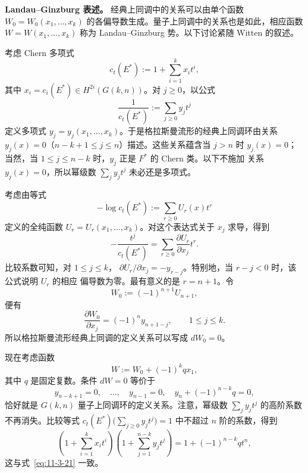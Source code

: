 \medskip
\noindent\textbf{Landau--Ginzburg 表述。}
经典上同调中的关系可以由单个函数
$W_0=W_0(x_1,\ldots,x_k)$ 的各偏导数生成。量子上同调中的关系也是如此，相应函数
$W=W(x_1,\ldots,x_k)$ 称为 Landau--Ginzburg 势。以下讨论紧随 Witten
 的叙述。

考虑 Chern 多项式
\[
  c_t(E^*):=1+\sum_{i=1}^kx_it^i,
\]
其中 $x_i=c_i(E^*)\in H^{2i}(G(k,n))$。对 $j\geq0$，以公式
\[
  \frac1{c_t(E^*)}:=\sum_{j\geq0}y_jt^j
\]
定义多项式 $y_j=y_j(x_1,\ldots,x_k)$。于是格拉斯曼流形的经典上同调环由关系
$y_j(x)=0$（$n-k+1\leq j\leq n$）描述。这些关系蕴含当 $j>n$ 时
$y_j(x)=0$；当然，当 $1\leq j\leq n-k$ 时，$y_j$ 正是 $F^*$ 的 Chern 类。以下不施加
关系 $y_j(x)=0$，所以幂级数 $\sum_jy_jt^j$ 未必还是多项式。

考虑由等式
\[
  -\log c_t(E^*):=\sum_{r\geq0}U_r(x)t^r
\]
定义的全纯函数 $U_r=U_r(x_1,\ldots,x_k)$。对这个表达式关于 $x_j$ 求导，得到
\[
  -\frac{t^j}{c_t(E^*)}
  =\sum_{r\geq0}\frac{\partial U_r}{\partial x_j}t^r.
\]
比较系数可知，对 $1\leq j\leq k$，
$\partial U_r/\partial x_j=-y_{r-j}$。特别地，当 $r-j<0$ 时，该公式说明 $U_r$ 的相应
偏导数为零。最有意义的是 $r=n+1$。令
\[
  W_0:=(-1)^{n+1}U_{n+1},
\]
便有
\[
  \frac{\partial W_0}{\partial x_j}=(-1)^ny_{n+1-j},
  \qquad 1\leq j\leq k.
\]
所以格拉斯曼流形经典上同调的定义关系可以写成 $dW_0=0$。

现在考虑函数
\[
  W:=W_0+(-1)^kqx_1,
\]
其中 $q$ 是固定复数。条件 $dW=0$ 等价于
\[
  y_{n-k+1}=0,\quad\ldots,\quad y_{n-1}=0,
  \quad y_n+(-1)^{n-k}q=0,
\]
恰好就是 $G(k,n)$ 量子上同调环的定义关系。注意，幂级数
$\sum_jy_jt^j$ 的高阶系数不再消失。比较等式
$c_t(E^*)\bigl(\sum_{j\geq0}y_jt^j\bigr)=1$ 中不超过 $n$ 阶的系数，得到
\[
  \left(1+\sum_{i=1}^kx_it^i\right)
  \left(1+\sum_{j=1}^{n-k}y_jt^j\right)
  =1+(-1)^{n-k}qt^n,
\]
这与式~\eqref{eq:11-3-21} 一致。

